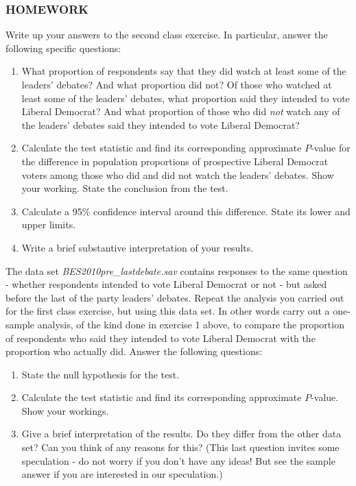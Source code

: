 \subsubsection{HOMEWORK}

Write up your answers to the second class exercise. In particular, answer the following
specific questions:
\begin{enumerate}
\item
What proportion of respondents say that they did watch at least some of the
leaders' debates? And what proportion did not? Of those who watched at
least some of the leaders' debates, what proportion said they intended
to vote Liberal Democrat? And what proportion of those who did
\emph{not} watch any of the leaders' debates said they intended to vote
Liberal Democrat?
\item
Calculate the test statistic and find its corresponding approximate $P$-value for the difference in
population proportions of prospective Liberal Democrat voters among those who did and did not
watch the leaders' debates. Show your working.
State the conclusion from the test.
\item
Calculate a 95\% confidence interval around this difference. State its lower and upper limits.
\item
Write a brief substantive interpretation of your results.
\end{enumerate}

The data set \emph{BES2010pre\_lastdebate.sav} contains responses to the
same question - whether respondents intended to vote Liberal Democrat or not - but
asked before the last of the party leaders' debates.
Repeat the analysis you carried out for the first class exercise, but using this
data set. In other words carry out a one-sample analysis,
of the kind done in exercise 1 above, to compare
the proportion of respondents who said they intended to vote Liberal Democrat with
the proportion who actually did. Answer the following questions:
\begin{enumerate}
\item
State the null hypothesis for the test.
\item
Calculate the test statistic and find its corresponding approximate $P$-value. Show your workings.
\item
Give a brief interpretation of the results. Do they differ from the other data set? Can you think
of any reasons for this? (This last question invites some speculation - do not worry if you don't
have any ideas! But see the sample answer if you are interested in our speculation.)
\end{enumerate}


